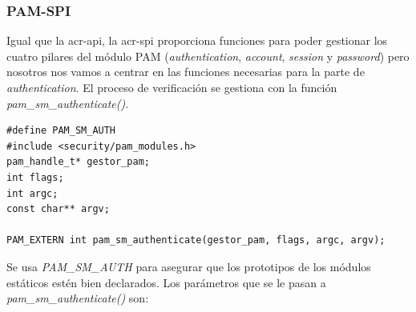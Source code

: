 \documentclass[titlepage, 12pt, a4paper]{article}
\begin{document}
\subsubsection{PAM-SPI}
Igual que la \gls{acr-api}, la \gls{acr-spi} proporciona funciones para poder gestionar los cuatro pilares del módulo PAM (\textit{authentication}, \textit{account}, \textit{session} y \textit{password}) pero nosotros nos vamos a centrar en las funciones necesarias para la parte de \textit{authentication}. El proceso de verificación se gestiona con la función \textit{pam\_sm\_authenticate()}.
\begin{lstlisting}
#define PAM_SM_AUTH
#include <security/pam_modules.h>
pam_handle_t* gestor_pam;
int flags;
int argc;
const char** argv;

PAM_EXTERN int pam_sm_authenticate(gestor_pam, flags, argc, argv);
\end{lstlisting}
Se usa \textit{PAM\_SM\_AUTH} para asegurar que los prototipos de los módulos estáticos estén bien declarados.
Los parámetros que se le pasan a \textit{pam\_sm\_authenticate()} son: 
\end{document}
